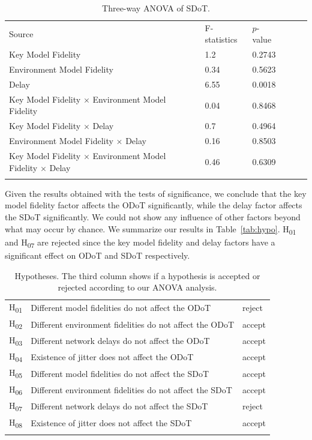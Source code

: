 \begin{table}[!htbp]
\caption{Three-way ANOVA of SDoT.}
\label{tab:tam}
\begin{tabular}{llllll}
\hline\noalign{\smallskip}
Source & F-statistics & $p$-value \\
\noalign{\smallskip}\hline\noalign{\smallskip}
Key Model Fidelity & 1.2 & 0.2743 \\
Environment Model Fidelity & 0.34 & 0.5623 \\
Delay & 6.55 & 0.0018 \\
Key Model Fidelity $\times$ Environment Model Fidelity & 0.04 & 0.8468 \\
Key Model Fidelity $\times$ Delay & 0.7 & 0.4964 \\
Environment Model Fidelity $\times$ Delay & 0.16 & 0.8503 \\
Key Model Fidelity $\times$ Environment Model Fidelity $\times$ Delay & 0.46 & 0.6309 \\
\noalign{\smallskip}\hline
\end{tabular}
\end{table}

Given the results obtained with the tests of significance, we conclude that the key model fidelity factor affects the ODoT significantly, while the delay factor affects the SDoT significantly. We could not show any influence of other factors beyond what may occur by chance. We summarize our results in Table~\ref{tab:hypo}.
H\textsubscript{01} and H\textsubscript{07} are rejected since the key model fidelity and delay factors have a significant effect on ODoT and SDoT respectively.

\begin{table}[!htbp]
\caption{Hypotheses. The third column shows if a hypothesis is accepted or rejected according to our ANOVA analysis.}
\label{tab:results}
\begin{tabular}{lll}
\hline\noalign{\smallskip}
H\textsubscript{01} & Different model fidelities do not affect the ODoT & reject \\
H\textsubscript{02} & Different environment fidelities do not affect the ODoT & accept \\
H\textsubscript{03} & Different network delays do not affect the ODoT & accept \\
H\textsubscript{04} & Existence of jitter does not affect the ODoT & accept \\
H\textsubscript{05} & Different model fidelities do not affect the SDoT & accept \\
H\textsubscript{06} & Different environment fidelities do not affect the SDoT & accept \\
H\textsubscript{07} & Different network delays do not affect the SDoT & reject \\
H\textsubscript{08} & Existence of jitter does not affect the SDoT & accept \\
\noalign{\smallskip}\hline
\end{tabular}
\end{table}

